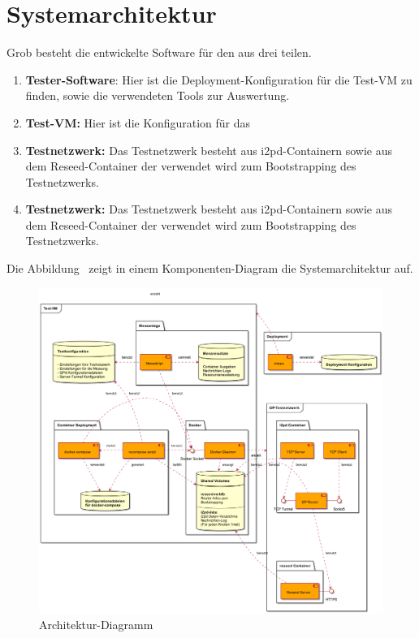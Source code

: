 \newpage

\section{Systemarchitektur}

Grob besteht die entwickelte Software für den aus drei teilen.

\begin{enumerate}
    \item \textbf{Tester-Software}: Hier ist die Deployment-Konfiguration für die Test-VM zu finden, sowie die verwendeten Tools zur Auswertung.
    \item \textbf{Test-VM:} Hier ist die Konfiguration für das 
    \item \textbf{Testnetzwerk:} Das Testnetzwerk besteht aus i2pd-Containern sowie aus dem Reseed-Container der verwendet wird zum Bootstrapping des Testnetzwerks.
    \item \textbf{Testnetzwerk:} Das Testnetzwerk besteht aus i2pd-Containern sowie aus dem Reseed-Container der verwendet wird zum Bootstrapping des Testnetzwerks.
\end{enumerate}

Die Abbildung~ zeigt in einem Komponenten-Diagram die Systemarchitektur auf.


\begin{landscape}%
\begin{figure}[ht]
  \includegraphics[height=0.85\textwidth]{include/uml/componentDiagram.png}
  \caption{Architektur-Diagramm}\label{fig:architektur-diagramm}
\end{figure}
\end{landscape}%


